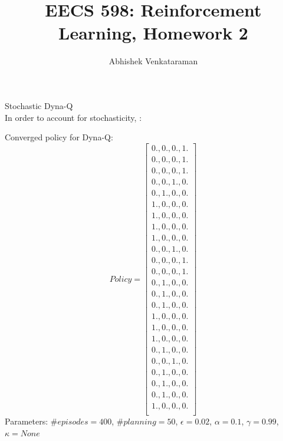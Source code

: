 \documentclass[12pt]{article}
\newenvironment{problem}[2][\large Problem]{\begin{trivlist}
\item[\hskip \labelsep {\bfseries #1}\hskip \labelsep {\bfseries #2.}]}{\end{trivlist}}
\begin{document}
 
 
 
\title{EECS 598: Reinforcement Learning, Homework 2}%
\author{Abhishek Venkataraman} %
 
\maketitle
 
\begin{problem} {1} Stochastic Dyna-Q
\\
In order to account for stochasticity, :

Converged policy for Dyna-Q:
$$ Policy = \begin{bmatrix} 
 0.,  0.,  0.,  1.\\
 0.,  0.,  0.,  1.\\
 0.,  0.,  0.,  1.\\
 0.,  0.,  1.,  0.\\
 0.,  1.,  0.,  0.\\
 1.,  0.,  0.,  0.\\
 1.,  0.,  0.,  0.\\
 1.,  0.,  0.,  0.\\
 1.,  0.,  0.,  0.\\
 0.,  0.,  1.,  0.\\
 0.,  0.,  0.,  1.\\
 0.,  0.,  0.,  1.\\
 0.,  1.,  0.,  0.\\
 0.,  1.,  0.,  0.\\
 0.,  1.,  0.,  0.\\
 1.,  0.,  0.,  0.\\
 1.,  0.,  0.,  0.\\
 1.,  0.,  0.,  0.\\
 0.,  1.,  0.,  0.\\
 0.,  0.,  1.,  0.\\
 0.,  1.,  0.,  0.\\
 0.,  1.,  0.,  0.\\
 0.,  1.,  0.,  0.\\
 1.,  0.,  0.,  0.\\
\end{bmatrix} $$ 
Parameters: $\#episodes = 400$, $\#planning = 50$, $\epsilon = 0.02$,
$\alpha = 0.1$, $\gamma = 0.99$, $\kappa = None$


\end{problem}
\end{document}
